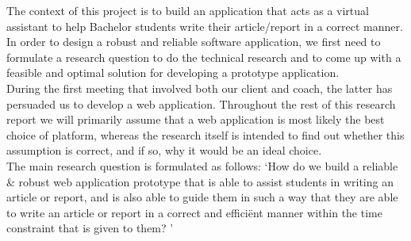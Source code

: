 The context of this project is to build an application that acts as a virtual assistant to help Bachelor students write their article/report in a correct manner. In order to design a robust and reliable software application, we first need to formulate a research question to do the technical research and to come up with a feasible and optimal solution for developing a prototype application.\\

During the first meeting that involved both our client and coach, the latter has persuaded us to develop a web application. Throughout the rest of this research report we will primarily assume that a web application is most likely the best choice of platform, whereas the research itself is intended to find out whether this assumption is correct, and if so, why it would be an ideal choice. \\

The main research question is formulated as follows: `How do we build a reliable \& robust web application prototype that is able to assist students in writing an article or report, and is also able to guide them in such a way that they are able to write an article or report in a correct and effici\"ent manner within the time constraint that is given to them? '

